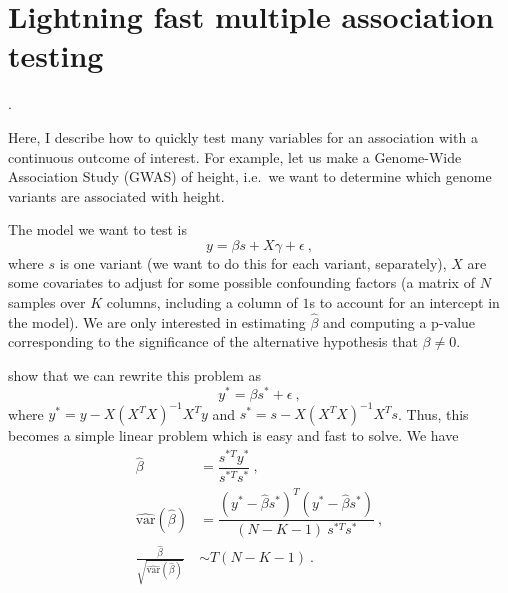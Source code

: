 \section{Lightning fast multiple association testing}.

Here, I describe how to quickly test many variables for an association with a continuous outcome of interest. For example, let us make a Genome-Wide Association Study (GWAS) of height, i.e.\ we want to determine which genome variants are associated with height.

The model we want to test is $$y = \beta s + X \gamma + \epsilon~,$$ where $s$ is one variant (we want to do this for each variant, separately), $X$ are some covariates to adjust for some possible confounding factors (a matrix of $N$ samples over $K$ columns, including a column of $1$s to account for an intercept in the model). 
We are only interested in estimating $\hat{\beta}$ and computing a p-value corresponding to the significance of the alternative hypothesis that $\beta \neq 0$.

\cite{sikorska2013gwas} show that we can rewrite this problem as $$y^* = \beta s^* + \epsilon~,$$ where $y^* = y - X (X^T X)^{-1} X^T y$ and $s^* = s - X (X^T X)^{-1} X^T s$. Thus, this becomes a simple linear problem which is easy and fast to solve. We have
\begin{align*}
\hat{\beta} &= \dfrac{s^{*T} y^*}{s^{*T} s^*} ~, \\
\widehat{\text{var}}(\hat{\beta}) &= \dfrac{(y^* - \hat{\beta} s^*)^T (y^* - \hat{\beta} s^*)}{(N - K - 1) ~ s^{*T} s^*} ~, \\
\frac{\hat{\beta}}{\sqrt{\widehat{\text{var}}(\hat{\beta})}} &\sim T(N - K - 1) ~.
\end{align*}

